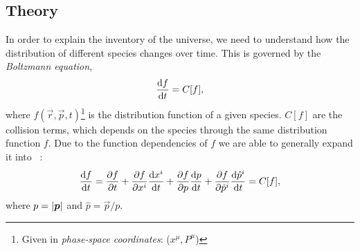 \subsection{Theory}\label{sec:m2:theory}
    In order to explain the inventory of the universe, we need to understand how the distribution of different species changes over time. This is governed by the \textit{Boltzmann equation},
    \begin{equation}\label{eq:m2:theory:bolzmann_def}
        \dv{f}{t} = C[f],
    \end{equation}
    where $f(\vec{r},\vec{p},t)$\footnote{Given in \textit{phase-space coordinates}: ($x^\mu,P^\mu$)} is the distribution function of a given species. $C[f]$ are the collision terms, which depends on the species through the same distribution function $f$. Due to the function dependencies of $f$ we are able to generally expand it into ~\cite[Eq. 3.33]{dodelson2020modern}:
    \begin{equation}\label{eq:m2:theory:bolzmann_expanded}
        \dv{f}{t} = \pdv{f}{t}+\pdv{f}{x^i}\dv{x^i}{t} + \pdv{f}{p}\dv{p}{t} + \pdv{f}{\hat{p}^i}\dv{\hat{p}^i}{t} = C[f],
    \end{equation}
    where $p=\abs{\boldsymbol{p}}$ and $\hat{p}=\vec{p}/p$.

